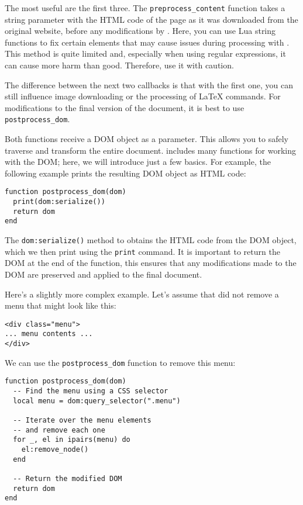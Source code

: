 \documentclass{ltugboat}
\newcommand\program[1]{\tbcode{#1}}
\begin{document}
The most useful are the first three. The \texttt{preprocess\_content} function
takes a string parameter with the HTML code of the page as it was downloaded
from the original website, before any modifications by \program{Rdrview}. Here,
you can use Lua string functions to fix certain elements that may cause issues
during processing with \program{Rdrview}. This method is quite limited and,
especially when using regular expressions, it can cause more harm than good.
Therefore, use it with caution.

The difference between the next two callbacks is that with the first one, you
can still influence image downloading or the processing of LaTeX commands. For
modifications to the final version of the document, it is best to use
\texttt{postprocess\_dom}.

Both functions receive a \program{LuaXML} DOM object as a parameter. This
allows you to safely traverse and transform the entire document.
\program{LuaXML} includes many functions for working with the DOM; here, we
will introduce just a few basics. For example, the following example prints the
resulting DOM object as HTML code:

\begin{verbatim}
function postprocess_dom(dom)
  print(dom:serialize())
  return dom
end
\end{verbatim}

The \texttt{dom:serialize()} method to obtains the HTML
code from the DOM object, which we then print using the \texttt{print} command.
It is important to return the DOM at the end of the function, this ensures that
any modifications made to the DOM are preserved and applied to the final
document.



Here's a slightly more complex example. Let's assume that \program{Rdrview} did
not remove a menu that might look like this:

\begin{verbatim}
<div class="menu">
... menu contents ...
</div>
\end{verbatim}

We can use the \texttt{postprocess\_dom} function to remove this menu:

\begin{verbatim}
function postprocess_dom(dom)
  -- Find the menu using a CSS selector
  local menu = dom:query_selector(".menu")

  -- Iterate over the menu elements 
  -- and remove each one
  for _, el in ipairs(menu) do
    el:remove_node()
  end
  
  -- Return the modified DOM
  return dom
end
\end{verbatim}
\end{document}
